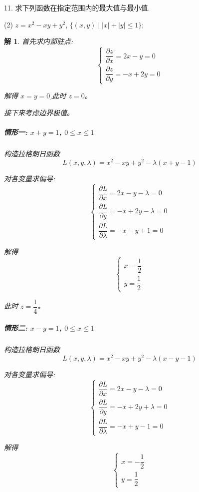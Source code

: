\documentclass[a4paper,12pt]{article}
\newtheorem*{sol}{解}
\begin{document}
11. 求下列函数在指定范围内的最大值与最小值.

(2) $z = x^2 - xy + y^2$, $\{(x,y)\mid |x| + |y| \leq 1\}$;
\begin{sol}
    首先求内部驻点:
    $$\begin{cases}
            \dfrac{\partial z}{\partial x}=2x-y=0 \\[8pt]
            \dfrac{\partial z}{\partial y}=-x+2y=0
        \end{cases}$$

    解得 $x=y=0$,此时 $z=0$。

    接下来考虑边界极值。

    \subparagraph*{情形一: $x+y=1$, $0\leq x\leq 1$}

    构造拉格朗日函数
    $$L(x,y,\lambda)=x^2-xy+y^2-\lambda(x+y-1)$$

    对各变量求偏导:
    $$\begin{cases}
            \dfrac{\partial L}{\partial x}=2x-y-\lambda=0  \\[8pt]
            \dfrac{\partial L}{\partial y}=-x+2y-\lambda=0 \\[8pt]
            \dfrac{\partial L}{\partial \lambda}=-x-y+1=0
        \end{cases}$$

    解得
    $$\begin{cases}
            x=\dfrac{1}{2} \\[8pt]
            y=\dfrac{1}{2}
        \end{cases}$$

    此时 $z=\dfrac{1}{4}$。

    \subparagraph*{情形二: $x-y=1$, $0\leq x\leq 1$}

    构造拉格朗日函数
    $$L(x,y,\lambda)=x^2-xy+y^2-\lambda(x-y-1)$$

    对各变量求偏导:
    $$\begin{cases}
            \dfrac{\partial L}{\partial x}=2x-y-\lambda=0  \\[8pt]
            \dfrac{\partial L}{\partial y}=-x+2y+\lambda=0 \\[8pt]
            \dfrac{\partial L}{\partial \lambda}=-x+y-1=0
        \end{cases}$$

    解得
    $$\begin{cases}
            x=-\dfrac{1}{2} \\[8pt]
            y=\dfrac{1}{2}
        \end{cases}$$


\end{sol}
\end{document}
